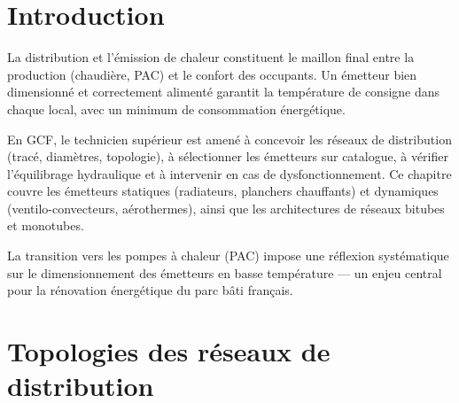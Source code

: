 \section{Introduction}

La distribution et l'émission de chaleur constituent le maillon final entre la production (chaudière, PAC) et le confort des occupants. Un émetteur bien dimensionné et correctement alimenté garantit la température de consigne dans chaque local, avec un minimum de consommation énergétique.

En GCF, le technicien supérieur est amené à concevoir les réseaux de distribution (tracé, diamètres, topologie), à sélectionner les émetteurs sur catalogue, à vérifier l'équilibrage hydraulique et à intervenir en cas de dysfonctionnement. Ce chapitre couvre les émetteurs statiques (radiateurs, planchers chauffants) et dynamiques (ventilo-convecteurs, aérothermes), ainsi que les architectures de réseaux bitubes et monotubes.

La transition vers les pompes à chaleur (PAC) impose une réflexion systématique sur le dimensionnement des émetteurs en basse température — un enjeu central pour la rénovation énergétique du parc bâti français.

\section{Topologies des réseaux de distribution}

